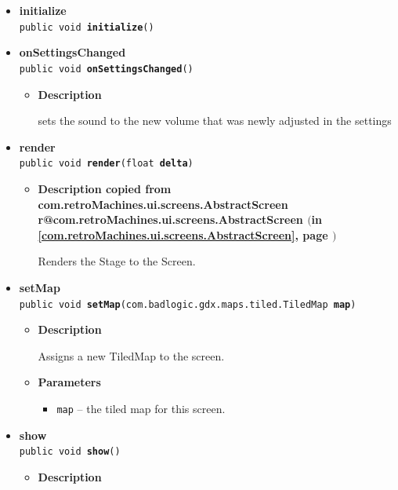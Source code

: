 \documentclass[11pt,a4paper]{report}
\makeatletter
\newcommand{\refdefined}[1]{
\expandafter\ifx\csname r@#1\endcsname\relax
\relax\else
{$($in \ref{#1}, page \pageref{#1}$)$}\fi}
\makeatother
\begin{document}
{{{{{{{{{{{{{\begin{itemize}
{\begin{itemize}
{Abolishes the screen and cleans up behind it.
}
\end{itemize}
}%
\item{ 
{\bf  initialize}\\
\texttt{public void\ {\bf  initialize}()
\label{com.retroMachines.ui.screens.game.GameScreen.initialize()}}%
}%
\item{ 
{\bf  onSettingsChanged}\\
\texttt{public void\ {\bf  onSettingsChanged}()
\label{com.retroMachines.ui.screens.game.GameScreen.onSettingsChanged()}}%
\begin{itemize}
\item{
{\bf  Description}

sets the sound to the new volume that was newly adjusted in the settings
}
\end{itemize}
}%
\item{ 
{\bf  render}\\
\texttt{public void\ {\bf  render}(\texttt{float} {\bf  delta})
\label{com.retroMachines.ui.screens.game.GameScreen.render(float)}}%
\begin{itemize}
\item{
{\bf  Description copied from com.retroMachines.ui.screens.AbstractScreen{\small \refdefined{com.retroMachines.ui.screens.AbstractScreen}} }

Renders the Stage to the Screen.
}
\end{itemize}
}%
\item{ 
{\bf  setMap}\\
\texttt{public void\ {\bf  setMap}(\texttt{com.badlogic.gdx.maps.tiled.TiledMap} {\bf  map})
\label{com.retroMachines.ui.screens.game.GameScreen.setMap(com.badlogic.gdx.maps.tiled.TiledMap)}}%
\begin{itemize}
\item{
{\bf  Description}

Assigns a new TiledMap to the screen.
}
\item{
{\bf  Parameters}
  \begin{itemize}
   \item{
\texttt{map} -- the tiled map for this screen.}
  \end{itemize}
}%
\end{itemize}
}%
\item{ 
{\bf  show}\\
\texttt{public void\ {\bf  show}()
\label{com.retroMachines.ui.screens.game.GameScreen.show()}}%
\begin{itemize}
\item{
{\bf  Description}

}
\end{itemize}}
\end{itemize}}}}}}}}}}}}}}
\end{document}
